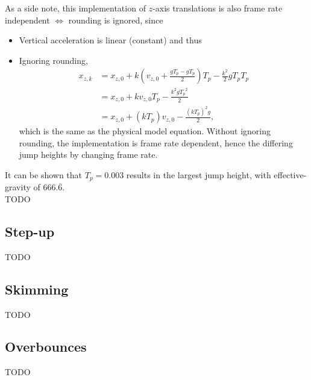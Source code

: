 As a side note, this implementation of $z$-axis translations is also frame rate independent $\Longleftrightarrow$ rounding is ignored, since
\begin{itemize}
\item
Vertical acceleration is linear (constant) and thus
\item
Ignoring rounding,
\begin{align*}
x_{z,k} &= x_{z,0} + k\left(v_{z,0} + \frac{gT_p - gT_p}{2} \right) T_p - \frac{k^2}{2} gT_p T_p\\
&= x_{z,0} + kv_{z,0} T_p - \frac{k^2 g{T_p}^2}{2}\\
&= x_{z,0} + \left(kT_p \right) v_{z,0} - \frac{\left(kT_p \right)^2 g}{2},
\end{align*}
which is the same as the physical model equation.
Without ignoring rounding, the implementation is frame rate dependent, hence the differing jump heights by changing frame rate.
\end{itemize}

It can be shown that $T_p = 0.003$ results in the largest jump height, with effective-gravity of $666.\overline{6}$.\\
TODO


\subsection{Step-up}
\label{sec:stepup}
TODO


\subsection{Skimming}
\label{sec:skimming}
TODO


\subsection{Overbounces}
\label{sec:overbounce}
TODO%
